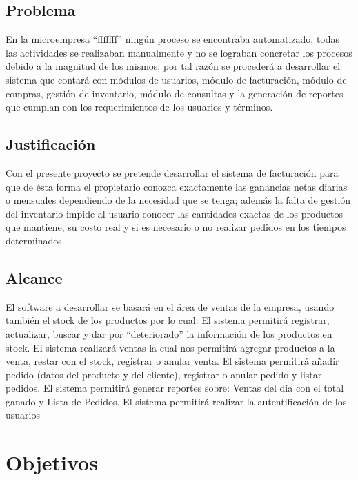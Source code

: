 \documentclass[preprint,12pt]{elsarticle}
\begin{document}
	\subsection{\textbf{Problema}}
 En la microempresa “fffffff” ningún proceso se encontraba automatizado, todas
las actividades se realizaban manualmente y no se lograban concretar los procesos debido a la
magnitud de los mismos; por tal razón se procederá a desarrollar el sistema que contará con
módulos de usuarios, módulo de facturación, módulo de compras, gestión de inventario, módulo
de consultas y la generación de reportes que cumplan con los requerimientos de los usuarios
 y términos.
	\subsection{\textbf{Justificación }}
Con el  presente proyecto  se pretende desarrollar el sistema de facturación para que de ésta forma el propietario conozca exactamente las ganancias netas diarias o mensuales
dependiendo de la necesidad que se tenga; además la falta de gestión del inventario impide al
usuario conocer las cantidades exactas de los productos que mantiene, su costo real y si es
necesario o no realizar pedidos en los tiempos determinados.

	\subsection{\textbf{ Alcance }}
El software a desarrollar se basará en el área de ventas de la empresa, usando también el stock de los productos por lo cual:
El sistema permitirá registrar, actualizar, buscar y dar por “deteriorado” la información de los productos en stock. 
El sistema realizará ventas la cual nos permitirá agregar productos a la venta, restar con el stock, registrar o anular venta. 
El sistema permitirá añadir pedido (datos del producto y del cliente), registrar o anular pedido y listar pedidos.
El sistema permitirá generar reportes sobre: Ventas del día con el total ganado y Lista de Pedidos.
El sistema permitirá realizar la autentificación de los usuarios


\section{Objetivos}
\end{document}
